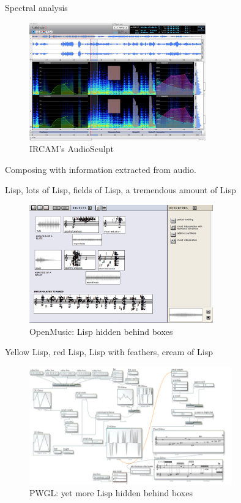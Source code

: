 \begin{frame}{Spectral analysis}
    \begin{figure}
    \begin{centering}
    \includegraphics[height=2in]{assets/include-audiosculpt.jpg}
    \caption{IRCAM's AudioSculpt}
    \end{centering}
    \end{figure}
    Composing with information extracted from audio.
\end{frame}

\begin{frame}{Lisp, lots of Lisp, fields of Lisp, a tremendous amount of Lisp}
    \begin{figure}
    \begin{centering}
    \includegraphics[height=2in]{assets/include-open-music.png}
    \caption{OpenMusic: Lisp hidden behind boxes}
    \end{centering}
    \end{figure}
\end{frame}

\begin{frame}{Yellow Lisp, red Lisp, Lisp with feathers, cream of Lisp}
    \begin{figure}
    \begin{centering}
    \includegraphics[height=2in]{assets/include-pwgl.jpg}
    \caption{PWGL: yet more Lisp hidden behind boxes}
    \end{centering}
    \end{figure}
\end{frame}

